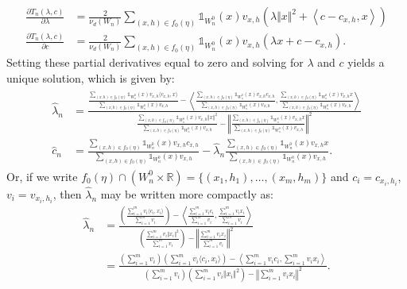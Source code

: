 \documentclass{article}
\newcommand{\RR}{\mathbb{R}}
\theoremstyle{plain}
\theoremstyle{remark}
\theoremstyle{definition}
\begin{document}
\begin{align*}
\frac{\partial T_n(\lambda, c)}{\partial \lambda} &= \frac{2}{\nu_d(W_n)}\sum_{(x,h) \in f_0(\eta)} \mathds{1}_{W_n^0}(x)v_{x,h}\left(\lambda \Vert x \Vert^2 +\left\langle c - c_{x,h},x \right\rangle \right) \\
\frac{\partial T_n(\lambda, c)}{\partial c} &= \frac{2}{\nu_d(W_n)}\sum_{(x,h) \in f_0(\eta)} \mathds{1}_{W_n^0}(x)v_{x,h}\left(\lambda x + c - c_{x,h} \right).
\end{align*} 
Setting these partial derivatives equal to zero and solving for $\lambda$ and $c$ yields a unique solution, which is given by:
{\allowdisplaybreaks
\begin{align}
\begin{split}
    \hat{\lambda}_n &= \frac{\frac{\sum_{(x,h) \in f_0(\eta)} \mathds{1}_{W_n^0}(x)v_{x,h}\langle c_{x,h},x\rangle}{\sum_{(x,h) \in f_0(\eta)} \mathds{1}_{W_n^0}(x)v_{x,h}} - \left\langle \frac{\sum_{(x,h) \in f_0(\eta)} \mathds{1}_{W_n^0}(x)v_{x,h} c_{x,h}}{\sum_{(x,h) \in f_0(\eta)} \mathds{1}_{W_n^0}(x)v_{x,h}}, \frac{\sum_{(x,h) \in f_0(\eta)} \mathds{1}_{W_n^0}(x)v_{x,h}x}{\sum_{(x,h) \in f_0(\eta)} \mathds{1}_{W_n^0}(x)v_{x,h}} \right\rangle}{\frac{\sum_{(x,h) \in f_0(\eta)} \mathds{1}_{W_n^0}(x)v_{x,h}\Vert x \Vert^2}{\sum_{(x,h) \in f_0(\eta)} \mathds{1}_{W_n^0}(x)v_{x,h}} - \left\Vert \frac{\sum_{(x,h) \in f_0(\eta)} \mathds{1}_{W_n^0}(x)v_{x,h}x}{\sum_{(x,h) \in f_0(\eta)} \mathds{1}_{W_n^0}(x)v_{x,h}} \right\Vert^2} \\
    \hat{c}_n &= \frac{\sum_{(x,h) \in f_0(\eta)} \mathds{1}_{W_n^0}(x)v_{x,h} c_{x,h}}{\sum_{(x,h) \in f_0(\eta)} \mathds{1}_{W_n^0}(x)v_{x,h}} - \hat{\lambda}_n \frac{\sum_{(x,h) \in f_0(\eta)} \mathds{1}_{W_n^0}(x)v_{x,h} x}{\sum_{(x,h) \in f_0(\eta)} \mathds{1}_{W_n^0}(x)v_{x,h}}. \label{cn_lambdan_formula}
\end{split}
\end{align}
}%
Or, if we write $f_0(\eta) \cap (W_n^0 \times \RR) = \{(x_1,h_1),\dots,(x_m,h_m)\}$ and $c_i = c_{x_i,h_i}$, $v_i = v_{x_i,h_i}$, then $\hat{\lambda}_n$ may be written more compactly as:
\begin{align*}
    \hat{\lambda}_n &= \frac{\left(\frac{\sum_{i=1}^m v_i\langle c_i,x_i\rangle}{\sum_{i=1}^m v_i}\right) - \left\langle \frac{\sum_{i=1}^m v_i c_i}{\sum_{i=1}^m v_i}, \frac{\sum_{i=1}^m v_ix_i}{\sum_{i=1}^m v_i} \right\rangle}{\left(\frac{\sum_{i=1}^m v_i\Vert x_i \Vert^2}{\sum_{i=1}^m v_i}\right) - \left\Vert \frac{\sum_{i=1}^m v_ix_i}{\sum_{i=1}^m v_i} \right\Vert^2}\\
    &= \frac{\left(\sum_{i=1}^m v_i \right)\left(\sum_{i=1}^m v_i\langle c_i,x_i\rangle\right) - \left\langle \sum_{i=1}^m v_i c_i, \sum_{i=1}^m v_ix_i \right\rangle}{\left(\sum_{i=1}^m v_i \right)\left(\sum_{i=1}^m v_i\Vert x_i \Vert^2\right) - \left\Vert \sum_{i=1}^m v_ix_i \right\Vert^2}.
\end{align*}
\end{document}
